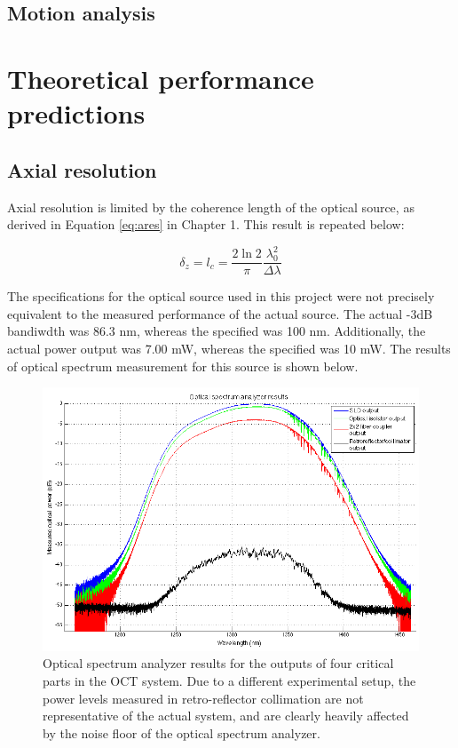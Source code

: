 \subsection{Motion analysis}

\section{Theoretical performance predictions}
\label{sec:theory_res}

\subsection{Axial resolution}
\label{sec:axial_res}

Axial resolution is limited by the coherence length of the optical source, as derived in Equation \ref{eq:ares} in Chapter 1. This result is repeated below:

\begin{equation} \label{eq:ares2}
\delta_z = l_c = \frac{2 \ln{2}}{\pi} \frac{\lambda_0^2}{\Delta \lambda}
\end{equation}

The specifications for the optical source used in this project were not precisely equivalent to the measured performance of the actual source. The actual -3dB bandiwdth was 86.3 nm, whereas the specified was 100 nm. Additionally, the actual power output was 7.00 mW, whereas the specified was 10 mW. The results of optical spectrum measurement for this source is shown below.

\begin{figure}[h!]
\centering
\includegraphics[width=1.0\textwidth]{Images/System/osa.png}
\caption{Optical spectrum analyzer results for the outputs of four critical parts in the OCT system. Due to a different experimental setup, the power levels measured in retro-reflector collimation are not representative of the actual system, and are clearly heavily affected by the noise floor of the optical spectrum analyzer. \label{fig:osa}}
\end{figure}

